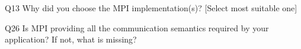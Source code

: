 \begin{description}%
\item{Q13} Why did you choose the MPI implementation(s)? [Select most suitable one]%
\item{Q26} Is MPI providing all the communication semantics required by your application? If not, what is missing?%
\end{description}%
